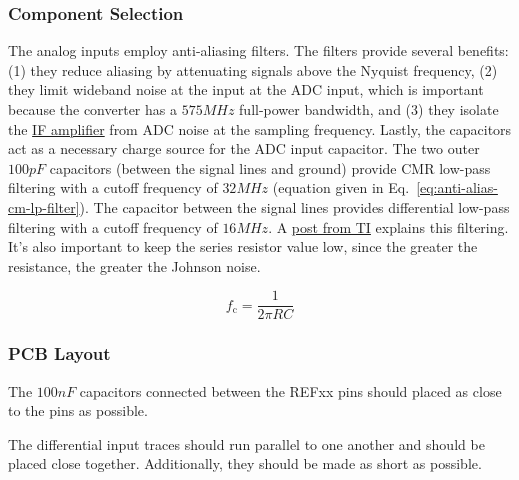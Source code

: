 \subsubsection{Component Selection}
\label{sec:ltc2292-component-selection}

The analog inputs employ anti-aliasing filters. The filters provide several benefits: (1) they
reduce aliasing by attenuating signals above the Nyquist frequency, (2) they limit wideband noise at
the input at the ADC input, which is important because the converter has a $575 \si{MHz}$ full-power
bandwidth, and (3) they isolate the \hyperref[sec:ada4940-2]{IF amplifier} from ADC noise at the
sampling frequency. Lastly, the capacitors act as a necessary charge source for the ADC input
capacitor. The two outer $100 \si{pF}$ capacitors (between the signal lines and ground) provide CMR
low-pass filtering with a cutoff frequency of $32 \si{MHz}$ (equation given in
Eq.~\ref{eq:anti-alias-cm-lp-filter}). The capacitor between the signal lines provides differential
low-pass filtering with a cutoff frequency of $16 \si{MHz}$. A
\href{https://e2e.ti.com/blogs_/archives/b/precisionhub/archive/2015/11/06/three-guidelines-for-designing-anti-aliasing-filters}{post
  from TI} explains this filtering. It's also important to keep the series resistor value low, since
the greater the resistance, the greater the Johnson noise.

\begin{equation}
        \label{eq:anti-alias-cm-lp-filter}
        f_{\text{c}} = \frac{1}{2 \pi R C}
\end{equation}

\subsubsection{PCB Layout}
\label{sec:ltc2292-pcb}

The $100 \si{nF}$ capacitors connected between the REFxx pins should placed as close to the pins as
possible.

The differential input traces should run parallel to one another and should be placed close
together. Additionally, they should be made as short as possible.

